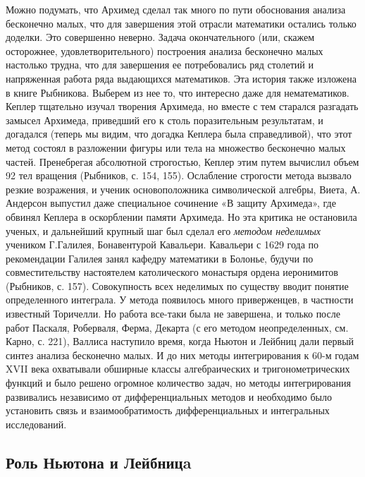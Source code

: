 Можно подумать, что Архимед сделал так много по пути обоснования
анализа бесконечно малых, что для завершения этой отрасли математики
остались только доделки. Это совершенно неверно. Задача окончательного
(или, скажем осторожнее, удовлетворительного) построения анализа
бесконечно малых настолько трудна, что для завершения ее потребовались
ряд столетий и напряженная работа ряда выдающихся математиков. Эта
история также изложена в книге Рыбникова. Выберем из нее то, что
интересно даже для нематематиков. Кеплер тщательно изучал творения
Архимеда, но вместе с тем старался разгадать замысел Архимеда,
приведший его к столь поразительным результатам, и догадался (теперь
мы видим, что догадка Кеплера была справедливой), что этот метод
состоял в разложении фигуры или тела на множество бесконечно малых
частей. Пренебрегая абсолютной строгостью, Кеплер этим путем вычислил
объем 92 тел вращения (Рыбников, с. 154, 155). Ослабление строгости
метода вызвало резкие возражения, и ученик основоположника
символической алгебры, Виета, А. Андерсон выпустил даже специальное
сочинение «В защиту Архимеда», где обвинял Кеплера в оскорблении
памяти Архимеда. Но эта критика не остановила ученых, и дальнейший
крупный шаг был сделал его \emph{методом неделимых} учеником
Г.Галилея, Бонавентурой Кавальери. Кавальери с 1629 года по
рекомендации Галилея занял кафедру математики в Болонье, будучи по
совместительству настоятелем католического монастыря ордена
иеронимитов (Рыбников, с. 157). Совокупность всех неделимых по
существу вводит понятие определенного интеграла. У метода появилось
много приверженцев, в частности известный Торичелли. Но работа
все-таки была не завершена, и только после работ Паскаля, Роберваля,
Ферма, Декарта (с его методом неопределенных, см. Карно, с. 221),
Валлиса наступило время, когда Ньютон и Лейбниц дали первый синтез
анализа бесконечно малых. И до них методы интегрирования к 60-м годам
XVII века охватывали обширные классы алгебраических и
тригонометрических функций и было решено огромное количество задач, но
методы интегрирования развивались независимо от дифференциальных
методов и необходимо было установить связь и взаимообратимость
дифференциальных и интегральных исследований.

\subsection{Роль Ньютона и Лейбницa}

